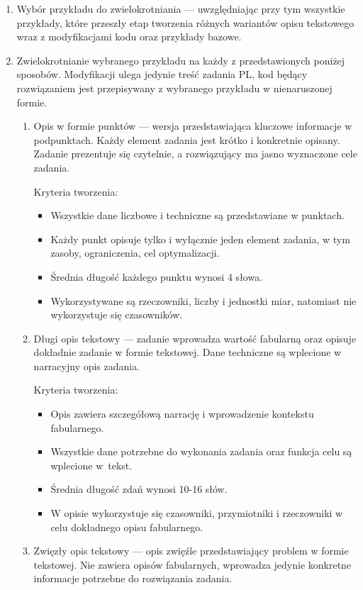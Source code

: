 \begin{enumerate}
\item Wybór przykładu do zwielokrotniania --- uwzględniając przy tym wszystkie przykłady, które przeszły etap tworzenia różnych wariantów opisu tekstowego wraz z modyfikacjami kodu oraz przykłady bazowe.
\item Zwielokrotnianie wybranego przykładu na każdy z przedstawionych poniżej sposobów. Modyfikacji ulega jedynie treść zadania PL, kod  będący rozwiązaniem jest przepisywany z wybranego przykładu w nienaruszonej formie.
\begin{enumerate}
\item Opis w formie punktów --- wersja przedstawiająca kluczowe informacje w podpunktach. Każdy element zadania jest krótko i konkretnie opisany. Zadanie prezentuje się czytelnie, a rozwiązujący ma jasno wyznaczone cele zadania.

Kryteria tworzenia:
	\begin{itemize}
		\item Wszystkie dane liczbowe i techniczne są przedstawiane w punktach.
		\item Każdy punkt opisuje tylko i wyłącznie jeden element zadania, w tym zasoby, ograniczenia, cel optymalizacji.
		\item Średnia długość każdego punktu wynosi 4 słowa.
		\item Wykorzystywane są rzeczowniki, liczby i jednostki miar, natomiast nie wykorzystuje się czasowników.
	\end{itemize}
	
\item Długi opis tekstowy --- zadanie wprowadza wartość fabularną oraz opisuje dokładnie zadanie w formie tekstowej. Dane techniczne są wplecione w narracyjny opis zadania.

Kryteria tworzenia:
	\begin{itemize}
		\item Opis zawiera szczegółową narrację i wprowadzenie kontekstu fabularnego.
		\item Wszystkie dane potrzebne do wykonania zadania oraz funkcja celu są wplecione w~tekst.
		\item Średnia długość zdań wynosi 10-16 słów.
		\item W opisie wykorzystuje się czasowniki, przymiotniki i rzeczowniki w celu dokładnego opisu fabularnego.
	\end{itemize}

\item Zwięzły opis tekstowy --- opis zwięźle przedstawiający problem w formie tekstowej. Nie zawiera opisów fabularnych, wprowadza jedynie konkretne informacje potrzebne do rozwiązania zadania.


\end{enumerate}
\end{enumerate}
